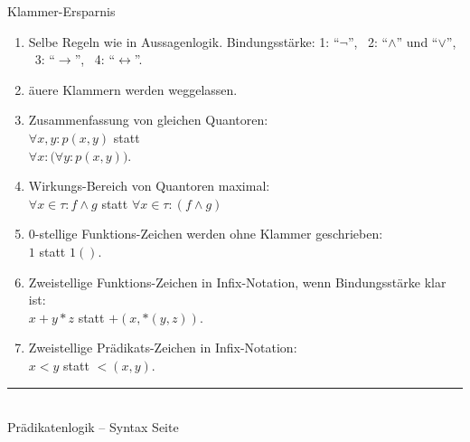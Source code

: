 \documentclass{slides}
\newcommand{\myrule}{\rule{20cm}{1mm}\\ }
\newcounter{mypage}
\begin{document}

\begin{slide}{}
\normalsize
\begin{center}
Klammer-Ersparnis
\end{center}
\vspace{0.5cm}

\footnotesize
\begin{enumerate}
\item Selbe Regeln wie in Aussagenlogik. Bindungsst\"{a}rke: 
  1: ``$\neg$'', \ 2: ``$\wedge$'' und ``$\vee$'', \ 3: ``$\rightarrow$'', \ 4: ``$\leftrightarrow$''.
\item \"{a}u\3ere Klammern werden weggelassen.
\item Zusammenfassung von gleichen Quantoren: \\[0.3cm]
      \hspace*{1.3cm} $\forall x, y: p(x, y)$  
      statt \\[0.3cm]
      \hspace*{1.3cm} $\forall x: \Bigg( \forall y: p(x,y) \Bigg)$. 
\item Wirkungs-Bereich von Quantoren maximal: \\[0.3cm]
      \hspace*{1.3cm} $\forall x\in\tau: f \wedge g$ \quad statt \quad $\forall x\in\tau: (f \wedge g)$
\item 0-stellige Funktions-Zeichen werden ohne Klammer geschrieben: \\[0.3cm]
      \hspace*{1.3cm} $1$ \quad statt \quad $1()$.
\item Zweistellige Funktions-Zeichen in Infix-Notation,
      wenn Bindungsst\"{a}rke klar ist: \\[0.3cm]
      \hspace*{1.3cm} $x + y * z$ \quad statt \quad $+(x, *(y,z))$.
\item Zweistellige Pr\"{a}dikats-Zeichen in Infix-Notation: \\[0.3cm]
      \hspace*{1.3cm} $x < y$ \quad statt \quad $<(x, y)$.
\end{enumerate}

\vspace*{\fill}
\tiny \addtocounter{mypage}{1}
\myrule
Pr\"{a}dikatenlogik -- Syntax  \hspace*{\fill} Seite 
\end{slide}
\end{document}

